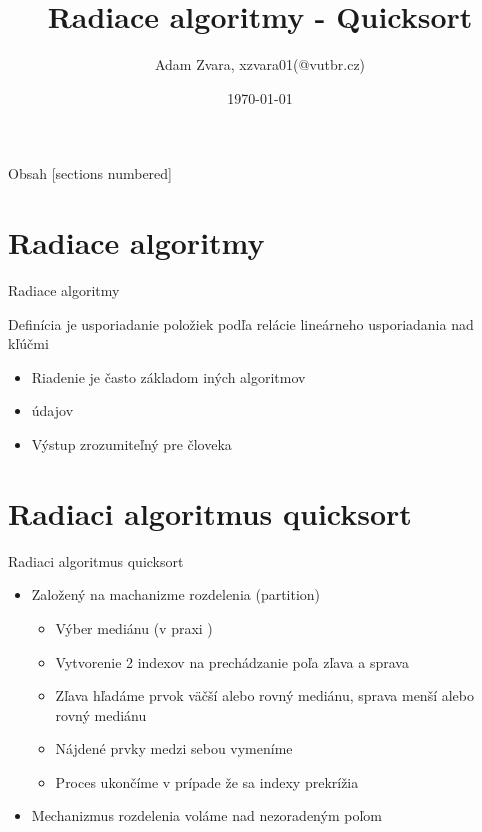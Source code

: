 \documentclass{beamer}
\title[Quicksort]{Radiace algoritmy - Quicksort}
\institute
{
  Fakulta informačných technológií\\
  Vysoké učení technické v Brne
}
\author[Adam Zvara]{Adam Zvara, xzvara01(@vutbr.cz)}
\date{\today}
\begin{document}
\frame[plain]{\titlepage}

\begin{frame}{Obsah}
  [sections numbered]
  \tableofcontents
\end{frame}

\section{Radiace algoritmy}
\begin{frame}{Radiace algoritmy}
  \begin{block}{Definícia}
     \cite{IALSorting} je usporiadanie položiek podľa relácie lineárneho usporiadania nad kľúčmi
  \end{block}
  \begin{itemize}
    \item Riadenie je často základom iných algoritmov
    \item {} údajov
    \item Výstup zrozumiteľný pre človeka
  \end{itemize}
\end{frame}

\section{Radiaci algoritmus quicksort}
\begin{frame}{Radiaci algoritmus quicksort}
  \begin{itemize}
    \item Založený na machanizme \alert{rozdelenia} (partition)
      \begin{itemize}
        \item Výber mediánu (v praxi )
        \item Vytvorenie 2 indexov na prechádzanie poľa zľava a sprava 
        \item Zľava hľadáme prvok väčší alebo rovný mediánu, sprava menší alebo rovný mediánu
        \item Nájdené prvky medzi sebou vymeníme
        \item Proces ukončíme v prípade že sa indexy prekrížia
    \end{itemize}
    \item Mechanizmus rozdelenia voláme nad nezoradeným poľom 
  \end{itemize}
\end{frame}
\end{document}
